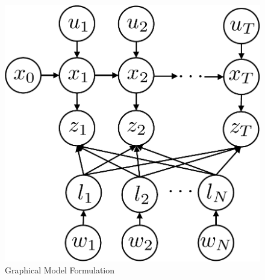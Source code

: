 \begin{figure}[h]
\begin{center}
 \includegraphics[width=0.5\linewidth]{fig/model} 
\end{center}
\caption{Graphical Model Formulation}
\label{fig:model}
\end{figure}
